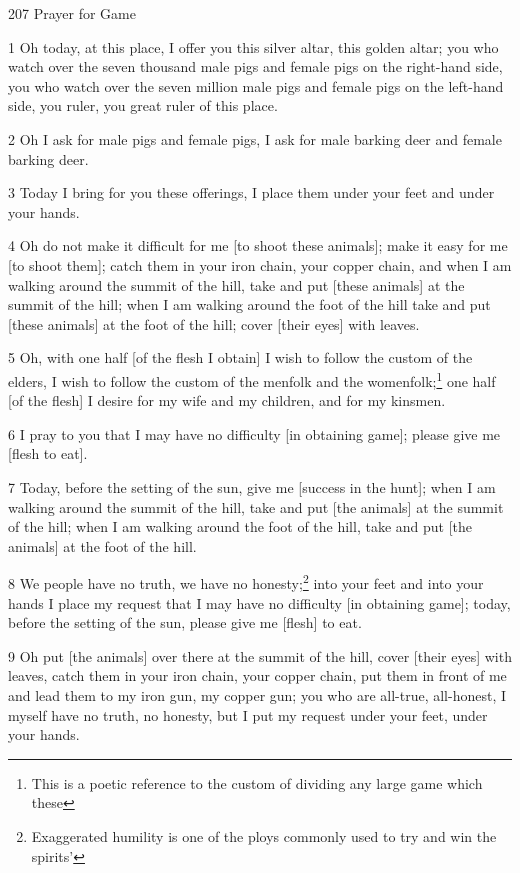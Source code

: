 
207 Prayer for Game

1 Oh today, at this place, I offer you this silver altar, this golden altar; you
who watch over the seven thousand male pigs and female pigs on the right-hand side,
you who watch over the seven million male pigs and female pigs on the left-hand
side, you ruler, you great ruler of this place.

2 Oh I ask for male pigs and female pigs, I ask for male barking deer and female
barking deer.

3 Today I bring for you these offerings, I place them under your feet and under
your hands.

4 Oh do not make it difficult for me [to shoot these animals]; make it easy for
me [to shoot them]; catch them in your iron chain, your copper chain, and when
I am walking around the summit of the hill, take and put [these animals] at the
summit of the hill; when I am walking around the foot of the hill take and put
[these animals] at the foot of the hill; cover [their eyes] with leaves.

5 Oh, with one half [of the flesh I obtain] I wish to follow the custom of the
elders, I wish to follow the custom of the menfolk and the womenfolk;\footnote{This is a poetic reference to the custom of dividing any large game which these} one half
[of the flesh] I desire for my wife and my children, and for my kinsmen.

6 I pray to you that I may have no difficulty [in obtaining game]; please give
me [flesh to eat].

7 Today, before the setting of the sun, give me [success in the hunt]; when I am
walking around the summit of the hill, take and put [the animals] at the summit
of the hill; when I am walking around the foot of the hill, take and put [the animals]
at the foot of the hill.

8 We people have no truth, we have no honesty;\footnote{Exaggerated humility is one of the ploys commonly used to try and win the spirits'} into your feet and into your
hands I place my request that I may have no difficulty [in obtaining game]; today,
before the setting of the sun, please give me [flesh] to eat.

9 Oh put [the animals] over there at the summit of the hill, cover [their eyes]
with leaves, catch them in your iron chain, your copper chain, put them in front
of me and lead them to my iron gun, my copper gun; you who are all-true, all-honest,
I myself have no truth, no honesty, but I put my request under your feet, under
your hands.

